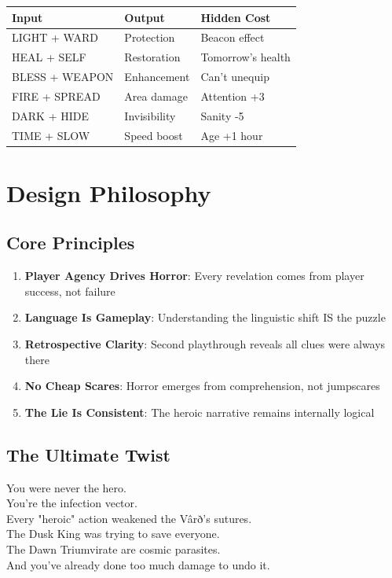 \documentclass[11pt,a4paper,twoside]{book}
\begin{document}
\begin{center}
\begin{tabular}{|l|l|l|}
\hline
\textbf{Input} & \textbf{Output} & \textbf{Hidden Cost} \\
\hline
LIGHT + WARD & Protection & Beacon effect \\
HEAL + SELF & Restoration & Tomorrow's health \\
BLESS + WEAPON & Enhancement & Can't unequip \\
FIRE + SPREAD & Area damage & Attention +3 \\
DARK + HIDE & Invisibility & Sanity -5 \\
TIME + SLOW & Speed boost & Age +1 hour \\
\hline
\end{tabular}
\end{center}

\chapter{Design Philosophy}

\section{Core Principles}

\begin{enumerate}
    \item \textbf{Player Agency Drives Horror}: Every revelation comes from player success, not failure
    \item \textbf{Language Is Gameplay}: Understanding the linguistic shift IS the puzzle
    \item \textbf{Retrospective Clarity}: Second playthrough reveals all clues were always there
    \item \textbf{No Cheap Scares}: Horror emerges from comprehension, not jumpscares
    \item \textbf{The Lie Is Consistent}: The heroic narrative remains internally logical
\end{enumerate}

\section{The Ultimate Twist}

\begin{tcolorbox}[horrorbox={The Final Truth}]
\centering
\Large
You were never the hero.\\
\vspace{0.5em}
\normalsize
You're the infection vector.\\
\vspace{1em}
Every "heroic" action weakened the Vârð's sutures.\\
The Dusk King was trying to save everyone.\\
The Dawn Triumvirate are cosmic parasites.\\
\vspace{1em}
And you've already done too much damage to undo it.
\end{tcolorbox}
\end{document}
